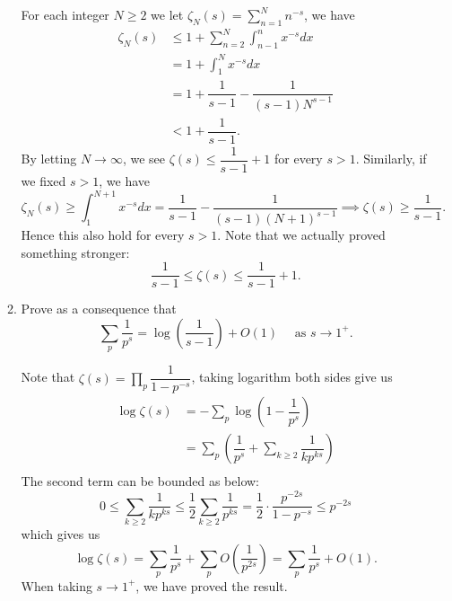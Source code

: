 \documentclass{article}
\begin{document}
\begin{enumerate}
\begin{enumerate}
        \begin{solution}
            For each integer $N\geq 2$ we let $\zeta_N(s) = \sum_{n=1}^N n^{-s}$, we have
            \begin{align*}
                \zeta_N(s)&\leq 1+\sum_{n=2}^N \int_{n-1}^n x^{-s}dx\\
                &=1+\int_1^N x^{-s}dx\\
                &= 1+\dfrac1{s-1} - \dfrac1{(s-1)N^{s-1}}\\
                &< 1+\dfrac1{s-1}.
            \end{align*}
            By letting $N\to\infty$, we see $\zeta(s) \leq \dfrac1{s-1} + 1$ for every $s>1$.
            Similarly, if we fixed $s>1$, we have
            $$\zeta_N(s) \geq \int_1^{N+1} x^{-s}dx = \dfrac1{s-1} - \dfrac{1}{(s-1)(N+1)^{s-1}} \implies \zeta(s) \geq \dfrac1{s-1}.$$
            Hence this also hold for every $s>1$. Note that we actually proved something stronger:
            $$\dfrac1{s-1} \leq \zeta(s) \leq \dfrac1{s-1} + 1.$$
        \end{solution}
        \item Prove as a consequence that 
        $$\sum_p \dfrac1{p^s} = \log\left(\dfrac1{s-1}\right) + O(1)\quad\text{ as } s\to 1^+.$$
        \begin{solution}
            Note that $\zeta(s) = \prod_p \dfrac1{1-p^{-s}}$, taking logarithm both sides give us
            \begin{align*}
                \log\zeta(s) &= -\sum_p \log\left(1-\dfrac1{p^s}\right) \\
                &= \sum_p \left(\dfrac1{p^s} + \sum_{k\geq 2} \dfrac1{k p^{ks}}\right)\\
            \end{align*}
            The second term can be bounded as below:
            $$0\leq \sum_{k\geq 2} \dfrac1{k p^{ks}} \leq \frac12 \sum_{k\geq 2} \dfrac1{p^{ks}} = \frac12 \cdot \dfrac{p^{-2s}}{1-p^{-s}}\leq p^{-2s}$$
            which gives us
            $$\log\zeta(s) = \sum_p \dfrac1{p^s} + \sum_p O\left(\dfrac1{p^{2s}}\right) = \sum_p \dfrac1{p^s} + O(1).$$
            When taking $s\to 1^+$, we have proved the result.
        \end{solution}
    \end{enumerate}
\end{enumerate}
\end{document}
